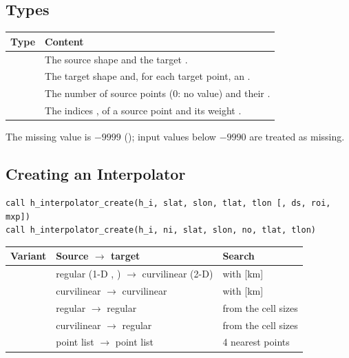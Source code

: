 \subsection{Types}

\begin{longtable}{L{3.2cm} L{10.8cm}}
  \toprule
  \textbf{Type} & \textbf{Content} \\
  \midrule
  \endhead
  \bottomrule
  \endfoot
   &
    The source shape  and the target . \\
   &
    The target shape  and, for each target point, an
    . \\
   &
    The number  of source points (0: no value) and their
    . \\
   &
    The indices ,  of a source point and its weight
    . \\
\end{longtable}

The missing value is $-9999$ (); input values below
$-9990$ are treated as missing.

\subsection{Creating an Interpolator}

\begin{lstlisting}
call h_interpolator_create(h_i, slat, slon, tlat, tlon [, ds, roi, mxp])
call h_interpolator_create(h_i, ni, slat, slon, no, tlat, tlon)
\end{lstlisting}

\begin{longtable}{L{3.6cm} L{3.4cm} L{7cm}}
  \toprule
  \textbf{Variant} & \textbf{Source $\to$ target} & \textbf{Search} \\
  \midrule
  \endhead
  \bottomrule
  \endfoot
   &
    regular (1-D , ) $\to$ curvilinear (2-D) &
    with  [km] \\
   &
    curvilinear $\to$ curvilinear &
    with  [km] \\
   &
    regular $\to$ regular &
    from the cell sizes \\
   &
    curvilinear $\to$ regular &
    from the cell sizes \\
   &
    point list $\to$ point list &
    4 nearest points \\
\end{longtable}

